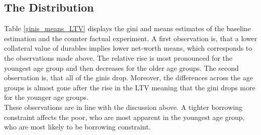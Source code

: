 \documentclass[a4paper,12pt,legno]{article}
\begin{document}
\subsection{The Distribution}
Table \ref{ginis_means_LTV} displays the gini and means estimates of the baseline estimation and the counter factual experiment. A first observation is, that a lower collateral value of durables implies lower net-worth means, which corresponds to the observations made above. The relative rise is most pronounced for the youngest age group and then decreases for the older age groups. 
The second observation is, that all of the ginis drop. Moreover, the differences across the age groups is almost gone after the rise in the LTV meaning that the gini drops more for the younger age groups. \\ These observations are in line with the discussion above. A tighter borrowing constraint affects the poor, who are most apparent in the youngest age group, who are most likely to be borrowing constraint. 
\end{document}
